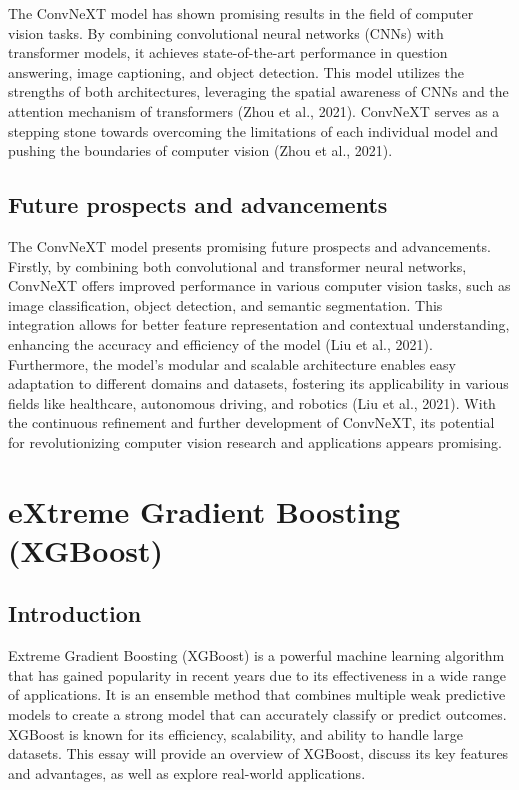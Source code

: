\documentclass[12pt,oneside]{report}
\begin{document}
The ConvNeXT model has shown promising results in the field of computer vision tasks. By combining convolutional neural networks (CNNs) with transformer models, it achieves state-of-the-art performance in question answering, image captioning, and object detection. This model utilizes the strengths of both architectures, leveraging the spatial awareness of CNNs and the attention mechanism of transformers (Zhou et al., 2021). ConvNeXT serves as a stepping stone towards overcoming the limitations of each individual model and pushing the boundaries of computer vision (Zhou et al., 2021).

\subsection{Future prospects and advancements}
The ConvNeXT model presents promising future prospects and advancements. Firstly, by combining both convolutional and transformer neural networks, ConvNeXT offers improved performance in various computer vision tasks, such as image classification, object detection, and semantic segmentation. This integration allows for better feature representation and contextual understanding, enhancing the accuracy and efficiency of the model (Liu et al., 2021). Furthermore, the model's modular and scalable architecture enables easy adaptation to different domains and datasets, fostering its applicability in various fields like healthcare, autonomous driving, and robotics (Liu et al., 2021). With the continuous refinement and further development of ConvNeXT, its potential for revolutionizing computer vision research and applications appears promising.

\section{eXtreme Gradient Boosting (XGBoost)}

\subsection{Introduction}
Extreme Gradient Boosting (XGBoost) is a powerful machine learning algorithm that has gained popularity in recent years due to its effectiveness in a wide range of applications. It is an ensemble method that combines multiple weak predictive models to create a strong model that can accurately classify or predict outcomes. XGBoost is known for its efficiency, scalability, and ability to handle large datasets. This essay will provide an overview of XGBoost, discuss its key features and advantages, as well as explore real-world applications. 
\end{document}
